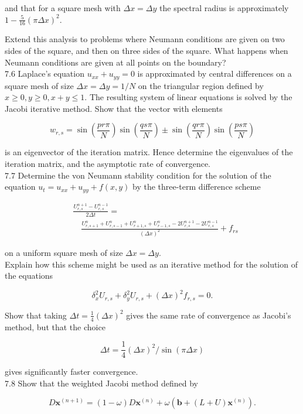 \documentclass[10pt]{article}
\begin{document}
and that for a square mesh with \(\Delta x=\Delta y\) the spectral radius is approximately \(1-\frac{5}{16}(\pi \Delta x)^{2}\).

Extend this analysis to problems where Neumann conditions are given on two sides of the square, and then on three sides of the square. What happens when Neumann conditions are given at all points on the boundary?\\
7.6 Laplace's equation \(u_{x x}+u_{y y}=0\) is approximated by central differences on a square mesh of size \(\Delta x=\Delta y=1 / N\) on the triangular region defined by \(x \geq 0, y \geq 0, x+y \leq 1\). The resulting system of linear equations is solved by the Jacobi iterative method. Show that the vector with elements

\[
w_{r, s}=\sin \left(\frac{p r \pi}{N}\right) \sin \left(\frac{q s \pi}{N}\right) \pm \sin \left(\frac{q r \pi}{N}\right) \sin \left(\frac{p s \pi}{N}\right)
\]

is an eigenvector of the iteration matrix. Hence determine the eigenvalues of the iteration matrix, and the asymptotic rate of convergence.\\
7.7 Determine the von Neumann stability condition for the solution of the equation \(u_{t}=u_{x x}+u_{y y}+f(x, y)\) by the three-term difference scheme

\[
\begin{aligned}
& \frac{U_{r, s}^{n+1}-U_{r, s}^{n-1}}{2 \Delta t}= \\
& \quad \frac{U_{r, s+1}^{n}+U_{r, s-1}^{n}+U_{r+1, s}^{n}+U_{r-1, s}^{n}-2 U_{r, s}^{n+1}-2 U_{r, s}^{n-1}}{(\Delta x)^{2}}+f_{r s}
\end{aligned}
\]

on a uniform square mesh of size \(\Delta x=\Delta y\).\\
Explain how this scheme might be used as an iterative method for the solution of the equations

\[
\delta_{x}^{2} U_{r, s}+\delta_{y}^{2} U_{r, s}+(\Delta x)^{2} f_{r, s}=0 .
\]

Show that taking \(\Delta t=\frac{1}{4}(\Delta x)^{2}\) gives the same rate of convergence as Jacobi's method, but that the choice

\[
\Delta t=\frac{1}{4}(\Delta x)^{2} / \sin (\pi \Delta x)
\]

gives significantly faster convergence.\\
7.8 Show that the weighted Jacobi method defined by

\[
D \mathbf{x}^{(n+1)}=(1-\omega) D \mathbf{x}^{(n)}+\omega\left(\mathbf{b}+(L+U) \mathbf{x}^{(n)}\right) .
\]
\end{document}

